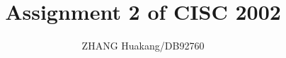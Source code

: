 \documentclass{article}
\title{Assignment 2 of CISC 2002}
\author{ZHANG Huakang/DB92760}
\begin{document}
    \maketitle
    \section{}
        
        
        \subsection{}
            
            
        \subsection{}
            
            
\end{document}
